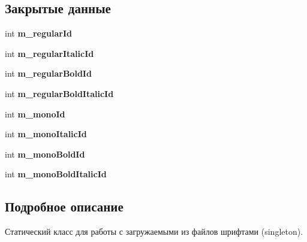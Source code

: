 \subsection*{Закрытые данные}
\begin{DoxyCompactItemize}
\item 
int {\bfseries m\+\_\+regular\+Id}\hypertarget{class_font_manager_a646476403ee76b0ff2a1b6c8cd8dd167}{}\label{class_font_manager_a646476403ee76b0ff2a1b6c8cd8dd167}

\item 
int {\bfseries m\+\_\+regular\+Italic\+Id}\hypertarget{class_font_manager_a378686fcdece0835591b5330dbc98523}{}\label{class_font_manager_a378686fcdece0835591b5330dbc98523}

\item 
int {\bfseries m\+\_\+regular\+Bold\+Id}\hypertarget{class_font_manager_a5cf5905c16f814e2b61bf847967d3f9c}{}\label{class_font_manager_a5cf5905c16f814e2b61bf847967d3f9c}

\item 
int {\bfseries m\+\_\+regular\+Bold\+Italic\+Id}\hypertarget{class_font_manager_a8bc9ed18056f9d28de306175cb926d5e}{}\label{class_font_manager_a8bc9ed18056f9d28de306175cb926d5e}

\item 
int {\bfseries m\+\_\+mono\+Id}\hypertarget{class_font_manager_a39fd9ae79f9ca7fc2dcb12c12479a90a}{}\label{class_font_manager_a39fd9ae79f9ca7fc2dcb12c12479a90a}

\item 
int {\bfseries m\+\_\+mono\+Italic\+Id}\hypertarget{class_font_manager_a64d1fa182fc3ae29936aa75017358543}{}\label{class_font_manager_a64d1fa182fc3ae29936aa75017358543}

\item 
int {\bfseries m\+\_\+mono\+Bold\+Id}\hypertarget{class_font_manager_ac5b8f48513accb75075f64bc856b0e45}{}\label{class_font_manager_ac5b8f48513accb75075f64bc856b0e45}

\item 
int {\bfseries m\+\_\+mono\+Bold\+Italic\+Id}\hypertarget{class_font_manager_a9d4203ecc590815e7d09987099337a09}{}\label{class_font_manager_a9d4203ecc590815e7d09987099337a09}

\end{DoxyCompactItemize}


\subsection{Подробное описание}
Статический класс для работы с загружаемыми из файлов шрифтами (singleton). 


